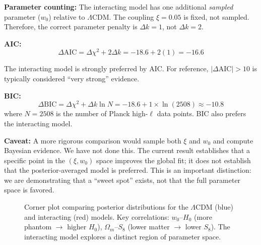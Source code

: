 \documentclass[twocolumn,showpacs,preprintnumbers,amsmath,amssymb,prd]{revtex4-2}
\begin{document}
\textbf{Parameter counting:} The interacting model has one additional \textit{sampled} parameter ($w_0$) relative to $\Lambda$CDM. The coupling $\xi = 0.05$ is fixed, not sampled. Therefore, the correct parameter penalty is $\Delta k = 1$, not $\Delta k = 2$.

\textbf{AIC:}
\begin{equation}
\Delta\text{AIC} = \Delta\chi^2 + 2\Delta k = -18.6 + 2(1) = -16.6
\end{equation}

The interacting model is strongly preferred by AIC. For reference, $|\Delta\text{AIC}| > 10$ is typically considered ``very strong'' evidence.

\textbf{BIC:}
\begin{equation}
\Delta\text{BIC} = \Delta\chi^2 + \Delta k \ln N = -18.6 + 1 \times \ln(2508) \approx -10.8
\end{equation}
where $N = 2508$ is the number of Planck high-$\ell$ data points. BIC also prefers the interacting model.

\textbf{Caveat:} A more rigorous comparison would sample both $\xi$ and $w_0$ and compute Bayesian evidence. We have not done this. The current result establishes that a specific point in the $(\xi, w_0)$ space improves the global fit; it does not establish that the posterior-averaged model is preferred. This is an important distinction: we are demonstrating that a ``sweet spot'' exists, not that the full parameter space is favored.

\begin{figure}[h]
\centering
{}
\caption{Corner plot comparing posterior distributions for the $\Lambda$CDM (blue) and interacting (red) models. Key correlations: $w_0$--$H_0$ (more phantom $\to$ higher $H_0$), $\Omega_m$--$S_8$ (lower matter $\to$ lower $S_8$). The interacting model explores a distinct region of parameter space.}
\label{fig:corner}
\end{figure}
\end{document}
